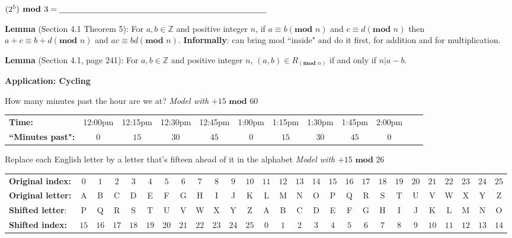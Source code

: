 \documentclass[12pt, oneside]{article}
\begin{document}
$(2^5) \textbf{ mod } 3 =  \underline{\phantom{\hspace{3.45in}}} $ 

\vfill

{\bf Lemma} (Section 4.1 Theorem 5): For $a, b \in \mathbb{Z}$ 
and positive integer $n$, if $a \equiv b (\textbf{mod } n)$ and $c \equiv d (\textbf{mod } n)$ 
then $a+c \equiv b+d (\textbf{mod } n)$ and $ac \equiv bd (\textbf{mod } n)$.
{\bf Informally}: can bring mod ``inside" and do it first, for addition and for multiplication.

\newpage



{\bf Lemma} (Section 4.1, page 241): For $a, b \in \mathbb{Z}$ 
and positive integer $n$, $(a,b) \in R_{(\textbf{mod } n)}$ if and only if  $n | a-b$.

\vfill
\vfill
\vfill
\vfill

{\bf Application: Cycling}

How many minutes past the hour are we at?  \hfill {\it Model with} $+15 \textbf{ mod } 60$

\begin{tabular}{lccccccccccc}
{\bf Time:} &12:00pm  &12:15pm&12:30pm  &12:45pm&1:00pm  &1:15pm&1:30pm  &1:45pm&2:00pm \\
{\bf ``Minutes past":} &$0$ & $15$ & $30$ & $45$ &$0$ & $15$ & $30$ & $45$ &$0$\\
\end{tabular}

Replace each English letter by a letter that's fifteen ahead of it in the alphabet
  \hfill {\it Model with} $+15 \textbf{ mod } 26$

{\tiny
\begin{tabular}{lcccccccccccccccccccccccccc}
{\bf Original index:} & $0$ & $1$
 & $2$ & $3$ &  $4$ & $5$ &  $6$ & $7$ &  $8$ & $9$ & $10$ & $11$ & $12$ & $13$ & $14$ & $15$ & 
  $16$ & $17$ &  $18$ & $19$ &  $20$ & $21$ &  $22$ & $23$ & $24$ & $25$\\
{\bf Original letter:} & A & B& C & D & E & F& G& H & I & J & K & L &M & N& O &P &Q & R & S & T & U & V & W & X & Y & Z \\
{\bf Shifted letter}: &P &Q & R & S & T & U & V & W & X & Y & Z & A & B& C & D & E & F& G& H & I & J & K & L &M & N& O \\
{\bf Shifted index:} &$15$ & 
  $16$ & $17$ &  $18$ & $19$ &  $20$ & $21$ &  $22$ & $23$ & $24$ & $25$ & $0$ & $1$
 & $2$ & $3$ &  $4$ & $5$ &  $6$ & $7$ &  $8$ & $9$ & $10$ & $11$ & $12$ & $13$ & $14$ 
\end{tabular}
}
\end{document}
